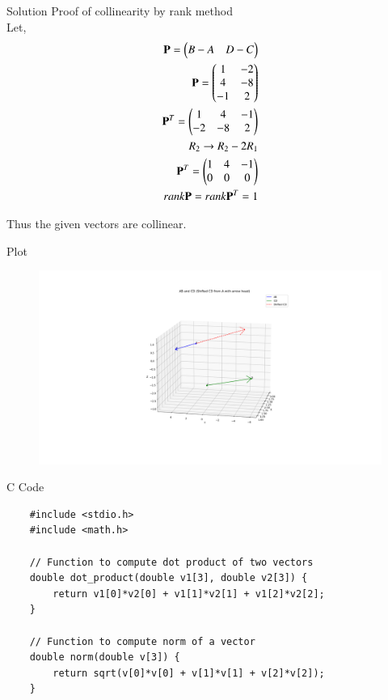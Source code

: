 \documentclass{beamer}
\begin{document}
\begin{frame}{Solution}
    Proof of collinearity by rank method \\
Let, 
\begin{align}
    \mathbf{P}=\begin{pmatrix}B-A & D-C\end{pmatrix} \\ 
    \mathbf{P}=\begin{pmatrix}1 & -2 \\ 
                   4 & -8 \\
                   -1 & 2\end{pmatrix} \\ 
    \mathbf{P}^T=\begin{pmatrix}1 & 4 & -1 \\
                     -2 & -8 & 2\end{pmatrix} \\ 
    R_2 \rightarrow R_2 - 2R_1 \\ 
    \mathbf{P}^T = \begin{pmatrix}1 & 4 & -1 \\ 
                       0 & 0 & 0\end{pmatrix} \\ 
    rank\mathbf{P}=rank\mathbf{P}^T = 1 \\ 
\end{align}

Thus the given vectors are collinear.
\end{frame}

\begin{frame}{Plot}
    \begin{figure}
        \centering
        \includegraphics[width=1\linewidth]{Figs/plot3_1.png}
        \caption{}
        \label{fig:placeholder}
    \end{figure}
\end{frame}

\begin{frame}[fragile]{C Code}
    \begin{verbatim}
    #include <stdio.h>
    #include <math.h>

    // Function to compute dot product of two vectors
    double dot_product(double v1[3], double v2[3]) {
        return v1[0]*v2[0] + v1[1]*v2[1] + v1[2]*v2[2];
    }

    // Function to compute norm of a vector
    double norm(double v[3]) {
        return sqrt(v[0]*v[0] + v[1]*v[1] + v[2]*v[2]);
    }
    \end{verbatim}
\end{frame}
\end{document}
